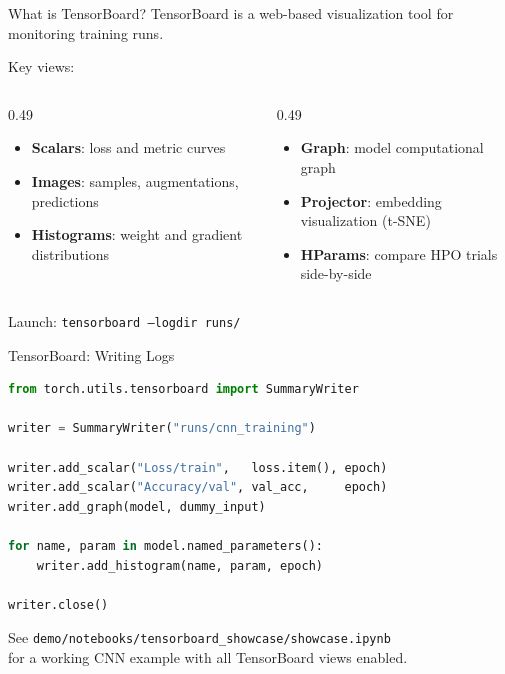 \documentclass[aspectratio=169]{beamer}
\begin{document}
\begin{frame}[t]{What is TensorBoard?}
TensorBoard is a web-based visualization tool for monitoring training runs.

\vspace{2mm}
Key views:
\begin{columns}[T,onlytextwidth]
    \begin{column}{0.49\textwidth}
        \begin{itemize}
            \item \textbf{Scalars}: loss and metric curves
            \item \textbf{Images}: samples, augmentations, predictions
            \item \textbf{Histograms}: weight and gradient distributions
        \end{itemize}
    \end{column}
    \begin{column}{0.49\textwidth}
        \begin{itemize}
            \item \textbf{Graph}: model computational graph
            \item \textbf{Projector}: embedding visualization (t-SNE)
            \item \textbf{HParams}: compare HPO trials side-by-side
        \end{itemize}
    \end{column}
\end{columns}
\vspace{2mm}
Launch: \texttt{tensorboard --logdir runs/}
\end{frame}

\begin{frame}[t,fragile]{TensorBoard: Writing Logs}
\vspace*{-0.7cm}
\begin{lstlisting}[language=Python, basicstyle=\footnotesize\ttfamily]
from torch.utils.tensorboard import SummaryWriter

writer = SummaryWriter("runs/cnn_training")

writer.add_scalar("Loss/train",   loss.item(), epoch)
writer.add_scalar("Accuracy/val", val_acc,     epoch)
writer.add_graph(model, dummy_input)

for name, param in model.named_parameters():
    writer.add_histogram(name, param, epoch)

writer.close()
\end{lstlisting}
\vspace{1mm}
See \texttt{demo/notebooks/tensorboard\_showcase/showcase.ipynb}\\for a working CNN example with all TensorBoard views enabled.
\end{frame}
\end{document}
